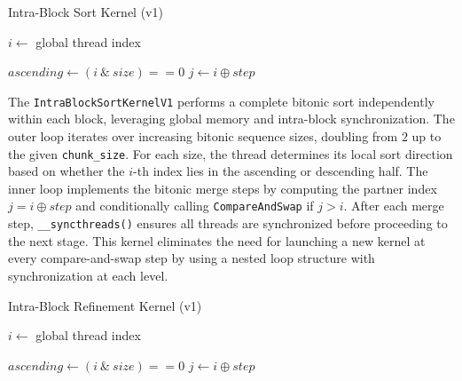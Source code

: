 \documentclass{article}
\begin{document}
\begin{algorithm}[H]
\caption{Intra-Block Sort Kernel (v1)}
\begin{algorithmic}[1]
    \State $i \gets$ global thread index
     \Return \EndIf

        \State $ascending \gets (i\ \&\ size) == 0$
            \State $j \gets i \oplus step$
                \State {}
            \EndIf
            \State {}
        \EndFor
    \EndFor
\EndProcedure
\end{algorithmic}
\end{algorithm}

The \texttt{IntraBlockSortKernelV1} performs a complete bitonic sort independently within each block, leveraging 
global memory and intra-block synchronization. The outer loop iterates over increasing bitonic sequence sizes, 
doubling from $2$ up to the given \texttt{chunk\_size}. For each size, the thread determines its local sort 
direction based on whether the $i$-th index lies in the ascending or descending half. The inner loop implements 
the bitonic merge steps by computing the partner index $j = i \oplus step$ and conditionally calling 
\texttt{CompareAndSwap} if $j > i$. After each merge step, \texttt{\_\_syncthreads()} ensures all threads are 
synchronized before proceeding to the next stage. This kernel eliminates the need for launching a new kernel at 
every compare-and-swap step by using a nested loop structure with synchronization at each level.

\begin{algorithm}[H]
\caption{Intra-Block Refinement Kernel (v1)}
\begin{algorithmic}[1]
    \State $i \gets$ global thread index
     \Return \EndIf

    \State $ascending \gets (i\ \&\ size) == 0$
        \State $j \gets i \oplus step$
            \State {}
        \EndIf
        \State {}
    \EndFor
\EndProcedure
\end{algorithmic}
\end{algorithm}
\end{document}
